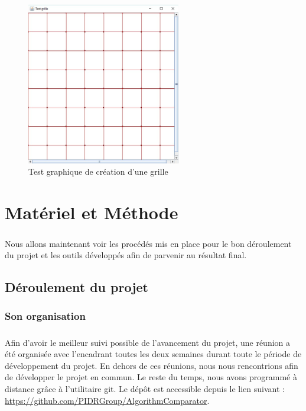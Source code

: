 \documentclass[pidr]{tnreport}
\begin{document}
\begin{figure}[H]
	\centering
    \includegraphics[width=0.6\textwidth]{./figures/ac_grille.jpg}
    \caption{Test graphique de création d'une grille}
\end{figure}

\clearpage

\chapter{Matériel et Méthode}

\paragraph{}
Nous allons maintenant voir les procédés mis en place pour le bon déroulement du projet et les outils développés afin de parvenir au résultat final.

	\section{Déroulement du projet}

		\subsection{Son organisation}

\paragraph{}
Afin d'avoir le meilleur suivi possible de l'avancement du projet, une réunion a été organisée avec l'encadrant toutes les deux semaines durant toute le période de développement du projet. En dehors de ces réunions, nous nous rencontrions afin de développer le projet en commun. Le reste du temps, nous avons programmé à distance grâce à l'utilitaire git. Le dépôt est accessible depuis le lien suivant : \url{https://github.com/PIDRGroup/AlgorithmComparator}.
\end{document}
